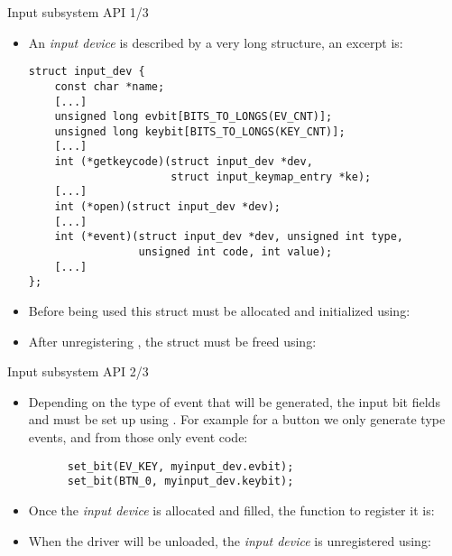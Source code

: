 \begin{frame}[fragile]{Input subsystem API 1/3}
  \begin{itemize}
  \item An {\em input device} is described by a very long
     structure, an excerpt is:
    \begin{block}{}
    \begin{verbatim}
struct input_dev {
    const char *name;
    [...]
    unsigned long evbit[BITS_TO_LONGS(EV_CNT)];
    unsigned long keybit[BITS_TO_LONGS(KEY_CNT)];
    [...]
    int (*getkeycode)(struct input_dev *dev,
                      struct input_keymap_entry *ke);
    [...]
    int (*open)(struct input_dev *dev);
    [...]
    int (*event)(struct input_dev *dev, unsigned int type,
                 unsigned int code, int value);
    [...]
};
\end{verbatim}
\end{block}
\item Before being used this struct must be allocated and initialized
  using: 
\item After unregistering , the struct must be freed
  using: 
  \end{itemize}
\end{frame}

\begin{frame}[fragile]{Input subsystem API 2/3}
  \begin{itemize}
  \item Depending on the type of event that will be generated, the
    input bit fields  and  must be set up
    using . For example for a button we only generate
     type events, and from those only  event
    code:
    \begin{block}{}
    \begin{verbatim}
      set_bit(EV_KEY, myinput_dev.evbit);
      set_bit(BTN_0, myinput_dev.keybit);
    \end{verbatim}
    \end{block}
  \item Once the {\em input device} is allocated and filled, the
    function to register it
    is: 
  \item When the driver will be unloaded, the {\em input device} is
    unregistered using:
  \end{itemize}
\end{frame}

